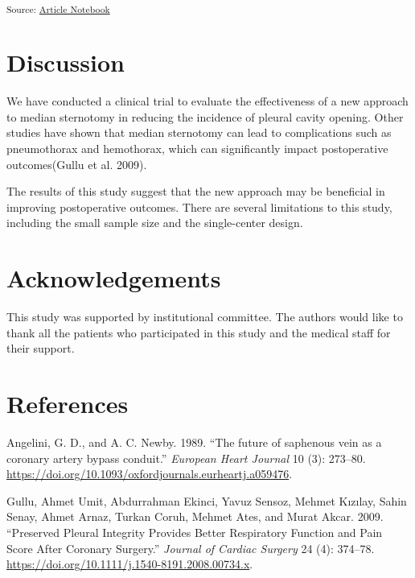 \documentclass[
  letterpaper,
  DIV=11,
  numbers=noendperiod]{scrartcl}
\newlength{\cslhangindent}
\newenvironment{CSLReferences}[2] %
 {\begin{list}{}{%
  \setlength{\itemindent}{0pt}
  \setlength{\leftmargin}{0pt}
  \setlength{\parsep}{0pt}
  \ifodd #1
   \setlength{\leftmargin}{\cslhangindent}
   \setlength{\itemindent}{-1\cslhangindent}
  \fi
  \setlength{\itemsep}{#2\baselineskip}}}
 {\end{list}}
\begin{document}
\textsubscript{Source:
\href{https://raffdoc.github.io/manuscript-template/index-preview.html}{Article
Notebook}}

\section{Discussion}\label{discussion}

We have conducted a clinical trial to evaluate the effectiveness of a
new approach to median sternotomy in reducing the incidence of pleural
cavity opening. Other studies have shown that median sternotomy can lead
to complications such as pneumothorax and hemothorax, which can
significantly impact postoperative outcomes(Gullu et al. 2009).

The results of this study suggest that the new approach may be
beneficial in improving postoperative outcomes. There are several
limitations to this study, including the small sample size and the
single-center design.

\section{Acknowledgements}\label{acknowledgements}

This study was supported by institutional committee. The authors would
like to thank all the patients who participated in this study and the
medical staff for their support.

\section*{References}\label{references}

\label{refs}
\begin{CSLReferences}{1}{0}
Angelini, G. D., and A. C. Newby. 1989. {``The future of saphenous vein
as a coronary artery bypass conduit.''} \emph{European Heart Journal} 10
(3): 273--80.
\url{https://doi.org/10.1093/oxfordjournals.eurheartj.a059476}.

Gullu, Ahmet Umit, Abdurrahman Ekinci, Yavuz Sensoz, Mehmet Kızılay,
Sahin Senay, Ahmet Arnaz, Turkan Coruh, Mehmet Ates, and Murat Akcar.
2009. {``Preserved Pleural Integrity Provides Better Respiratory
Function and Pain Score After Coronary Surgery.''} \emph{Journal of
Cardiac Surgery} 24 (4): 374--78.
\url{https://doi.org/10.1111/j.1540-8191.2008.00734.x}.

\end{CSLReferences}
\end{document}
